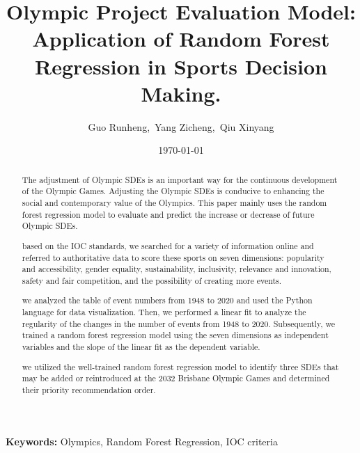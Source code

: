 \documentclass[a4paper]{article}
\title{\textbf{Olympic Project Evaluation Model: Application of Random Forest Regression in Sports Decision Making.}}
\author{ Guo Runheng,\ Yang Zicheng,\ Qiu Xinyang}
\date{\today}
\newcommand{\keywords}[1]{\par\noindent\textbf{Keywords:} #1}
\begin{document}
    \maketitle
\begin{abstract}
    The adjustment of Olympic SDEs is an important way for the continuous development of the Olympic Games. Adjusting the Olympic SDEs is conducive to enhancing the social and contemporary value of the Olympics. This paper mainly uses the random forest regression model to evaluate and predict the increase or decrease of future Olympic SDEs.
    \par based on the IOC standards, we searched for a variety of information online and referred to authoritative data to score these sports on seven dimensions: popularity and accessibility, gender equality, sustainability, inclusivity, relevance and innovation, safety and fair competition, and the possibility of creating more events.
    \par we analyzed the table of event numbers from 1948 to 2020 and used the Python language for data visualization. Then, we performed a linear fit to analyze the regularity of the changes in the number of events from 1948 to 2020. Subsequently, we trained a random forest regression model using the seven dimensions as independent variables and the slope of the linear fit as the dependent variable.
    \par we utilized the well-trained random forest regression model to identify three SDEs that may be added or reintroduced at the 2032 Brisbane Olympic Games and determined their priority recommendation order.
\end{abstract}
\keywords{Olympics, Random Forest Regression, IOC criteria}
\end{document}

